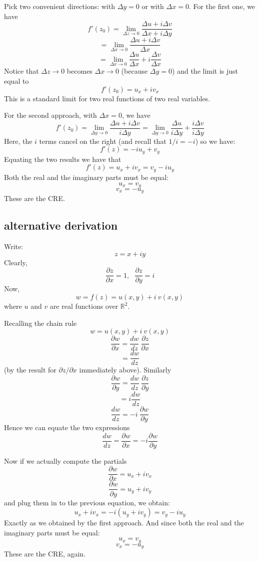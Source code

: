 \documentclass[11pt, oneside]{article}   	%
\begin{document}
Pick two convenient directions:  with $\Delta y = 0$ or with $\Delta x = 0$.  For the first one, we have
\[ f'(z_0) = \lim_{\Delta z \rightarrow 0} \frac{\Delta u + i \Delta v}{\Delta x + i \Delta y} \]
\[ =  \lim_{\Delta x \rightarrow 0} \frac{\Delta u + i \Delta v}{\Delta x} \]
\[  =  \lim_{\Delta x \rightarrow 0} \frac{\Delta u}{\Delta x} + i \frac{\Delta v}{\Delta x} \]
Notice that $\Delta z \rightarrow 0$ becomes $\Delta x \rightarrow 0$ (because $\Delta y = 0$) and the limit is just equal to 
\[ f'(z_0) = u_x + i v_x \]
This is a standard limit for two real functions of two real variables.

For the second approach, with $\Delta x = 0$, we have
\[ f'(z_0) =  \lim_{\Delta y \rightarrow 0} \frac{\Delta u + i \Delta v}{i \Delta y} = \lim_{\Delta y \rightarrow 0} \frac{\Delta u}{i \Delta y} +  \frac{i \Delta v}{i \Delta y} \]
Here, the $i$ terms cancel on the right (and recall that $1/i = -i$) so we have:
\[ f'(z) = -i u_y + v_y \]
Equating the two results we have that 
\[ f'(z) = u_x + i v_x = v_y - i u_y \]
Both the real and the imaginary parts must be equal:
\[ u_x = v_y \]
\[ v_x = - u_y \]
These are the CRE.
\subsection*{alternative derivation}
Write:
\[ z = x + iy \]
Clearly,
\[ \frac{\partial z}{\partial x} = 1, \ \ \ \frac{\partial z}{\partial y} = i \]
Now,
\[ w = f(z) = u(x,y) + i \ v(x,y) \]
where $u$ and $v$ are real functions over $\mathbb{R}^2$.

Recalling the chain rule
\[ w = u(x,y) + i \ v(x,y) \]
\[ \frac{\partial w}{\partial x} = \frac{dw}{dz} \ \frac{\partial z}{\partial x} \]
\[ =  \frac{dw}{dz} \]
(by the result for $\partial z/\partial x$ immediately above).
Similarly
\[ \frac{\partial w}{\partial y} = \frac{dw}{dz} \ \frac{\partial z}{\partial y} \]
\[ =  i \frac{dw}{dz} \]
\[  \frac{dw}{dz} = -i \ \frac{\partial w}{\partial y} \]
Hence we can equate the two expressions 
\[ \frac{dw}{dz} = \frac{\partial w}{\partial x} = -i \frac{\partial w}{\partial y} \]

Now if we actually compute the partials
\[ \frac{\partial w}{\partial x} = u_x + i v_x \]
\[ \frac{\partial w}{\partial y} = u_y + i v_y \]
and plug them in to the previous equation, we obtain:
\[ u_x + i v_x = -i (u_y + i v_y) = v_y - i u_y \]
Exactly as we obtained by the first approach.  And since both the real and the imaginary parts must be equal:
\[ u_x = v_y \]
\[ v_x = - u_y \]
These are the CRE, again.
\end{document}
